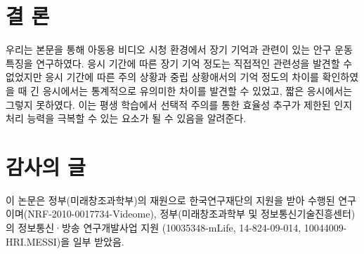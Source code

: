 \documentclass{kcc}
\begin{document}
\section{결 론}
우리는 본문을 통해 아동용 비디오 시청 환경에서 장기 기억과 관련이 있는 안구 운동 특징을 연구하였다. 응시 기간에 따른 장기 기억 정도는 직접적인 관련성을 발견할 수 없었지만 응시 기간에 따른 주의 상황과 중립 상황애서의 기억 정도의 차이를 확인하였을 때 긴 응시에서는 통계적으로 유의미한 차이를 발견할 수 있었고, 짧은 응시에서는 그렇지 못하였다. 이는 평생 학습에서 선택적 주의를 통한 효율성 추구가 제한된 인지 처리 능력을 극복할 수 있는 요소가 될 수 있음을 알려준다.


\section{감사의 글}
이 논문은 정부(미래창조과학부)의 재원으로 한국연구재단의 지원을 받아 수행된 연구이며(NRF-2010-0017734-Videome),
정부(미래창조과학부 및 정보통신기술진흥센터)의 정보통신·방송 연구개발사업 지원 (10035348-mLife, 14-824-09-014, 10044009-HRI.MESSI)을 일부 받았음.



\end{document}
